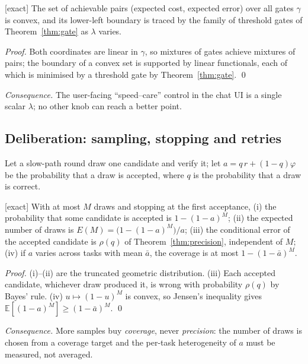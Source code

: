 \begin{proposition} \textnormal{[exact]}
\label{prop:frontier}
The set of achievable pairs (expected cost, expected error) over all gates
$\gamma$ is convex, and its lower-left boundary is traced by the family of
threshold gates of Theorem~\ref{thm:gate} as $\lambda$ varies.
\end{proposition}
\begin{proof}
Both coordinates are linear in $\gamma$, so mixtures of gates achieve
mixtures of pairs; the boundary of a convex set is supported by linear
functionals, each of which is minimised by a threshold gate by
Theorem~\ref{thm:gate}. \qed
\end{proof}
\emph{Consequence.} The user-facing ``speed--care'' control in the chat UI is
a single scalar $\lambda$; no other knob can reach a better point.

\subsection{Deliberation: sampling, stopping and retries}

Let a slow-path round draw one candidate and verify it; let
$a=q\,r+(1-q)\varphi$ be the probability that a draw is accepted, where $q$ is
the probability that a draw is correct.

\begin{theorem}
\textnormal{[exact]}
\label{thm:coverage}
With at most $M$ draws and stopping at the first acceptance,
(i) the probability that some candidate is accepted is $1-(1-a)^M$;
(ii) the expected number of draws is $E(M)=\big(1-(1-a)^M\big)/a$;
(iii) the conditional error of the accepted candidate is $\rho(q)$ of
Theorem~\ref{thm:precision}, independent of $M$;
(iv) if $a$ varies across tasks with mean $\bar a$, the coverage is at most
$1-(1-\bar a)^M$.
\end{theorem}
\begin{proof}
(i)--(ii) are the truncated geometric distribution. (iii) Each accepted
candidate, whichever draw produced it, is wrong with probability $\rho(q)$ by
Bayes' rule. (iv) $u\mapsto(1-u)^M$ is convex, so Jensen's inequality gives
$\mathbb E[(1-a)^M]\ge(1-\bar a)^M$. \qed
\end{proof}
\emph{Consequence.} More samples buy \emph{coverage}, never \emph{precision}:
the number of draws is chosen from a coverage target and the per-task
heterogeneity of $a$ must be measured, not averaged.

